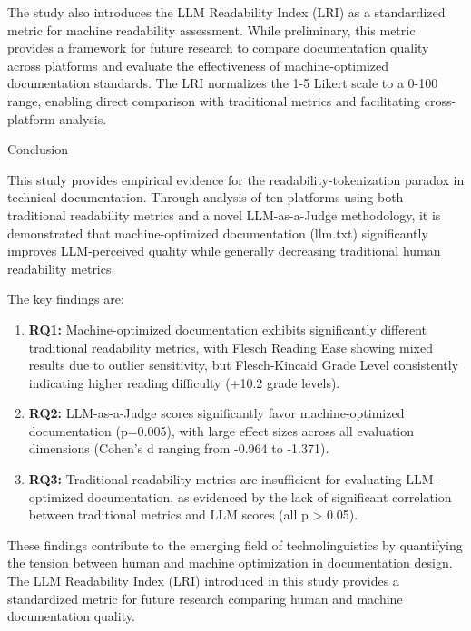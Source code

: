 \documentclass[10pt,conference,a4paper]{IEEEtran}
\makeatletter
\let\oldsection\section
\renewcommand{\section}{%
    \@ifstar{\sectionStar}{\sectionNoStar}%
}
\newcommand{\sectionStar}[1]{%
    \oldsection*{#1}%
    \vspace{-4pt}%
}
\newcommand{\sectionNoStar}[1]{%
    \oldsection{#1}%
    \vspace{-4pt}%
}
\makeatother
\begin{document}
The study also introduces the LLM Readability Index (LRI) as a standardized metric for machine readability assessment. While preliminary, this metric provides a framework for future research to compare documentation quality across platforms and evaluate the effectiveness of machine-optimized documentation standards. The LRI normalizes the 1-5 Likert scale to a 0-100 range, enabling direct comparison with traditional metrics and facilitating cross-platform analysis.

\section{Conclusion}

This study provides empirical evidence for the readability-tokenization paradox in technical documentation. Through analysis of ten platforms using both traditional readability metrics and a novel LLM-as-a-Judge methodology, it is demonstrated that machine-optimized documentation (llm.txt) significantly improves LLM-perceived quality while generally decreasing traditional human readability metrics.

The key findings are:

\begin{enumerate}
    \item \textbf{RQ1:} Machine-optimized documentation exhibits significantly different traditional readability metrics, with Flesch Reading Ease showing mixed results due to outlier sensitivity, but Flesch-Kincaid Grade Level consistently indicating higher reading difficulty (+10.2 grade levels).

    \item \textbf{RQ2:} LLM-as-a-Judge scores significantly favor machine-optimized documentation (p=0.005), with large effect sizes across all evaluation dimensions (Cohen's d ranging from -0.964 to -1.371).

    \item \textbf{RQ3:} Traditional readability metrics are insufficient for evaluating LLM-optimized documentation, as evidenced by the lack of significant correlation between traditional metrics and LLM scores (all p > 0.05).
\end{enumerate}

These findings contribute to the emerging field of technolinguistics by quantifying the tension between human and machine optimization in documentation design. The LLM Readability Index (LRI) introduced in this study provides a standardized metric for future research comparing human and machine documentation quality.
\end{document}
